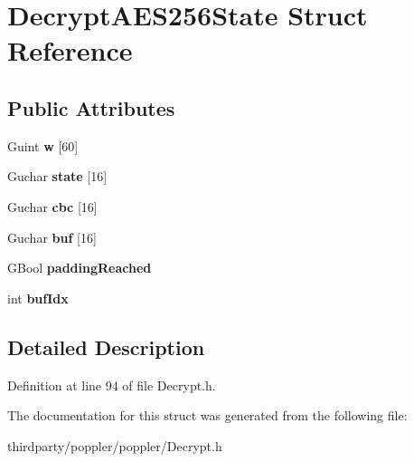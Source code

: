 \hypertarget{struct_decrypt_a_e_s256_state}{}\section{Decrypt\+A\+E\+S256\+State Struct Reference}
\label{struct_decrypt_a_e_s256_state}
\subsection*{Public Attributes}
\begin{DoxyCompactItemize}
\item 
\mbox{\label{struct_decrypt_a_e_s256_state_a832a831be38ef46f97570efcfdad0c30}} 
Guint {\bfseries w} \mbox{[}60\mbox{]}
\item 
\mbox{\label{struct_decrypt_a_e_s256_state_a9125d0e9b8a74bef15c6568d37ccf07b}} 
Guchar {\bfseries state} \mbox{[}16\mbox{]}
\item 
\mbox{\label{struct_decrypt_a_e_s256_state_af37b89d9f39a0b5af409788965951f0a}} 
Guchar {\bfseries cbc} \mbox{[}16\mbox{]}
\item 
\mbox{\label{struct_decrypt_a_e_s256_state_a0c06ac9750b34880fa631e8a8297b2f0}} 
Guchar {\bfseries buf} \mbox{[}16\mbox{]}
\item 
\mbox{\label{struct_decrypt_a_e_s256_state_a1a8d3468a8069ee01fb6055e2d6f35ed}} 
G\+Bool {\bfseries padding\+Reached}
\item 
\mbox{\label{struct_decrypt_a_e_s256_state_a218f803434c7d94163a98725458bb589}} 
int {\bfseries buf\+Idx}
\end{DoxyCompactItemize}


\subsection{Detailed Description}


Definition at line 94 of file Decrypt.\+h.



The documentation for this struct was generated from the following file\+:\begin{DoxyCompactItemize}
\item 
thirdparty/poppler/poppler/Decrypt.\+h\end{DoxyCompactItemize}
